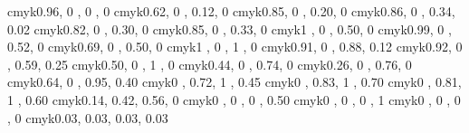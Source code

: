 \definecolor{processblue}   {cmyk}{0.96, 0   , 0   , 0   }
\definecolor{skyblue}       {cmyk}{0.62, 0   , 0.12, 0   }
\definecolor{turquoise}     {cmyk}{0.85, 0   , 0.20, 0   }
\definecolor{tealblue}      {cmyk}{0.86, 0   , 0.34, 0.02}
\definecolor{aquamarine}    {cmyk}{0.82, 0   , 0.30, 0   }
\definecolor{bluegreen}     {cmyk}{0.85, 0   , 0.33, 0   }
\definecolor{emerald}       {cmyk}{1   , 0   , 0.50, 0   }
\definecolor{junglegreen}   {cmyk}{0.99, 0   , 0.52, 0   }
\definecolor{seagreen}      {cmyk}{0.69, 0   , 0.50, 0   }
\definecolor{green}         {cmyk}{1   , 0   , 1   , 0   }
\definecolor{forestgreen}   {cmyk}{0.91, 0   , 0.88, 0.12}
\definecolor{pinegreen}     {cmyk}{0.92, 0   , 0.59, 0.25}
\definecolor{limegreen}     {cmyk}{0.50, 0   , 1   , 0   }
\definecolor{yellowgreen}   {cmyk}{0.44, 0   , 0.74, 0   }
\definecolor{springgreen}   {cmyk}{0.26, 0   , 0.76, 0   }
\definecolor{olivegreen}    {cmyk}{0.64, 0   , 0.95, 0.40}
\definecolor{rawsienna}     {cmyk}{0   , 0.72, 1   , 0.45}
\definecolor{sepia}         {cmyk}{0   , 0.83, 1   , 0.70}
\definecolor{brown}         {cmyk}{0   , 0.81, 1   , 0.60}
\definecolor{tan}           {cmyk}{0.14, 0.42, 0.56, 0   }
\definecolor{gray}          {cmyk}{0   , 0   , 0   , 0.50}
\definecolor{black}         {cmyk}{0   , 0   , 0   , 1   }
\definecolor{white}         {cmyk}{0   , 0   , 0   , 0   } 
\definecolor{mygray}        {cmyk}{0.03, 0.03, 0.03, 0.03}









\ifpdf
        \usepackage[plainpages=false,pdfpagelabels,bookmarksnumbered,%
        colorlinks= true,%
        linkcolor=black, %
        citecolor=black, %
        filecolor=black, %
        pagecolor=black, %
        urlcolor=black, %
        pdftex,%
        unicode]{hyperref} 
%    
%    
    \usepackage{thumbpdf} 
\else
    \usepackage{hyperref}
\fi

\usepackage{memhfixc}

\settypeblocksize{23cm}{16cm}{*}

